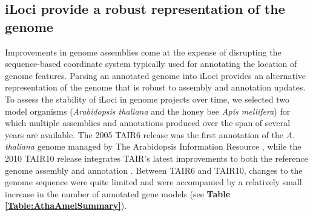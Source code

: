 %

\subsection{iLoci provide a robust representation of the genome}
Improvements in genome assemblies come at the expense of disrupting the sequence-based coordinate system typically used for annotating the location of genome features.
Parsing an annotated genome into iLoci provides an alternative representation of the genome that is robust to assembly and annotation updates.
To assess the stability of iLoci in genome projects over time, we selected two model organisms (\textit{Arabidopsis thaliana} and the honey bee \textit{Apis mellifera}) for which multiple assemblies and annotations produced over the span of several years are available.
The 2005 TAIR6 release was the first annotation of the \textit{A. thaliana} genome managed by The Arabidopsis Information Resource \cite{TAIR}, while the 2010 TAIR10 release integrates TAIR's latest improvements to both the reference genome assembly and annotation \cite{TAIR10}.
Between TAIR6 and TAIR10, changes to the genome sequence were quite limited and were accompanied by a relatively small increase in the number of annotated gene models (see \textbf{Table \ref{Table:AthaAmelSummary}}).

